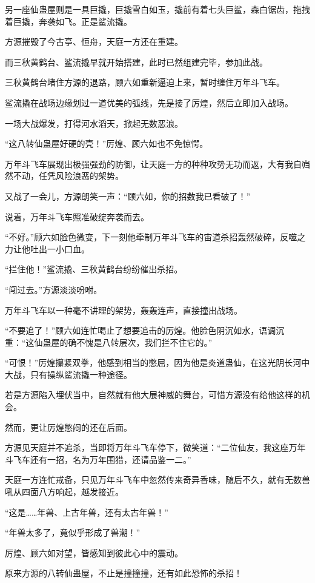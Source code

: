 \begin{this_body}
另一座仙蛊屋则是一具巨撬，巨撬雪白如玉，撬前有着七头巨鲨，森白锯齿，拖拽着巨撬，奔袭如飞。正是鲨流撬。

方源摧毁了今古亭、恒舟，天庭一方还在重建。

而三秋黄鹤台、鲨流撬早就开始搭建，此时已然组建完毕，参加此战。

三秋黄鹤台堵住方源的退路，顾六如重新逼迫上来，暂时缠住万年斗飞车。

鲨流撬在战场边缘划过一道优美的弧线，先是接了厉煌，然后立即加入战场。

一场大战爆发，打得河水滔天，掀起无数恶浪。

“这八转仙蛊屋好硬的壳！”厉煌、顾六如也不免惊愕。

万年斗飞车展现出极强强劲的防御，让天庭一方的种种攻势无功而返，大有我自岿然不动，任凭风险浪恶的架势。

又战了一会儿，方源朗笑一声：“顾六如，你的招数我已看破了！”

说着，万年斗飞车照准破绽奔袭而去。

“不好。”顾六如脸色微变，下一刻他牵制万年斗飞车的宙道杀招轰然破碎，反噬之力让他吐出一小口血。

“拦住他！”鲨流撬、三秋黄鹤台纷纷催出杀招。

“闯过去。”方源淡淡吩咐。

万年斗飞车以一种毫不讲理的架势，轰轰连声，直接撞出战场。

“不要追了！”顾六如连忙喝止了想要追击的厉煌。他脸色阴沉如水，语调沉重：“这仙蛊屋的确不愧是八转层次，我们拦不住它的。”

“可恨！”厉煌攥紧双拳，他感到相当的憋屈，因为他是炎道蛊仙，在这光阴长河中大战，只有操纵鲨流撬一种途径。

若是方源陷入埋伏当中，自然就有他大展神威的舞台，可惜方源没有给他这样的机会。

然而，更让厉煌憋闷的还在后面。

方源见天庭并不追杀，当即将万年斗飞车停下，微笑道：“二位仙友，我这座万年斗飞车还有一招，名为万年围猎，还请品鉴一二。”

天庭一方连忙戒备，只见万年斗飞车中忽然传来奇异香味，随后不久，就有无数兽吼从四面八方响起，越发接近。

“这是……年兽、上古年兽，还有太古年兽！”

“年兽太多了，竟似乎形成了兽潮！”

厉煌、顾六如对望，皆感知到彼此心中的震动。

原来方源的八转仙蛊屋，不止是撞撞撞，还有如此恐怖的杀招！

\end{this_body}

